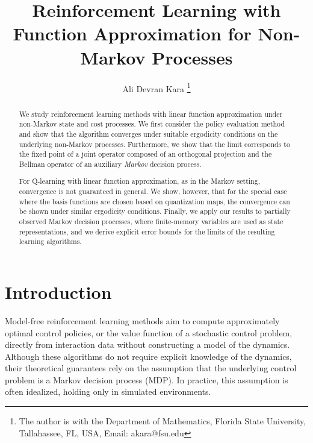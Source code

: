 \documentclass[11pt]{article}
\begin{document}
\sloppy
\title{Reinforcement Learning with Function Approximation for Non-Markov Processes}
\author{Ali Devran Kara
\thanks{The author is with the Department of Mathematics,
     Florida State University, Tallahassee, FL, USA,
     Email: akara@fsu.edu}
     }
\maketitle

\maketitle
\begin{abstract}
We study reinforcement learning methods with linear function approximation under non-Markov state and cost processes. We first consider the policy evaluation method and show that the algorithm converges under suitable ergodicity conditions on the underlying non-Markov processes. Furthermore, we show that the limit corresponds to the fixed point of a joint operator composed of an orthogonal projection and the Bellman operator of an auxiliary \emph{Markov} decision process. 

For Q-learning with linear function approximation, as in the Markov setting, convergence is not guaranteed in general. We show, however, that for the special case where the basis functions are chosen based on quantization maps, the convergence can be shown under similar ergodicity conditions. Finally, we apply our results to partially observed Markov decision processes, where finite-memory variables are used as state representations, and we derive explicit error bounds for the limits of the resulting learning algorithms.
\end{abstract}


\section{Introduction}

Model-free reinforcement learning methods aim to compute approximately optimal control policies, or the value function of a stochastic control problem, directly from interaction data without constructing a model of the dynamics. Although these algorithms do not require explicit knowledge of the dynamics, their theoretical guarantees  rely on the assumption that the underlying control problem is a Markov decision process (MDP). In practice, this assumption is often idealized, holding only in simulated environments.
\end{document}

